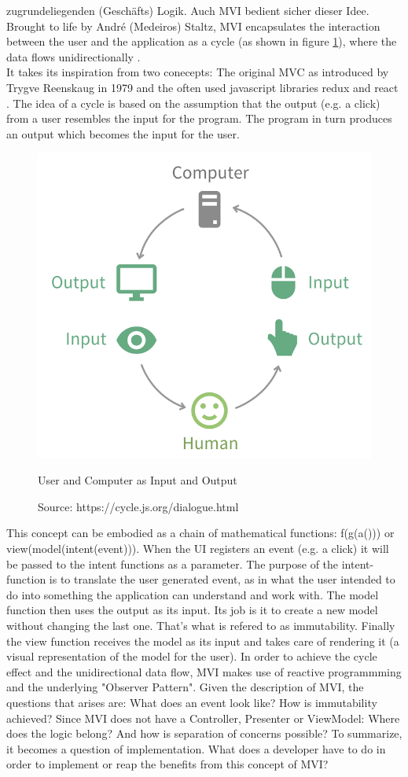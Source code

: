 zugrundeliegenden (Geschäfts) Logik. Auch MVI bedient sicher dieser Idee.
Brought to life by André (Medeiros) Staltz, MVI encapsulates the interaction between the user and the application as a cycle (as shown in figure \ref{fig:userComputerInputOutput}), 
where the data flows unidirectionally \cite{unidirectionalDataFlowRedux}.
\\
It takes its inspiration from two conecepts: The original MVC as introduced by Trygve Reenskaug in 1979 \cite{wikipediaTrygveReenskaug} and the often used 
javascript libraries redux \cite{redux} and react \cite{react}. 
The idea of a cycle is based on the assumption that the output (e.g. a click) from a user resembles the input for the program. The program in turn produces an output 
which becomes the input for the user.
\begin{figure}[ht]
    \centering
    \includegraphics[height=0.5\textwidth]{./images/mvi-cycle}
    \caption{User and Computer as Input and Output}
    \caption*{Source: https://cycle.js.org/dialogue.html}
    \label{fig:userComputerInputOutput}
\end{figure}
This concept can be embodied as a chain of mathematical functions: f(g(a())) or view(model(intent(event))).
When the UI registers an event (e.g. a click) it will be passed to the intent functions as a parameter. The purpose of the intent-function is 
to translate the user generated event, as in what the user intended to do into something the application can understand and work with.
The model function then uses the output as its input. Its job is it to create a new model without changing the last one. That's what is refered to as immutability. 
\cite{immutableObjectsEffectiveJava}
Finally the view function receives the model as its input and takes care of rendering it (a visual representation of the model for the user). 
In order to achieve the cycle effect and the unidirectional data flow, MVI makes use of reactive programmming \cite{reactiveProgrammingIntroAndreStaltz} and the underlying "Observer Pattern".
Given the description of MVI, the questions that arises are: What does an event look like? How is immutability achieved?
Since MVI does not have a Controller, Presenter or ViewModel: Where does the logic belong? And how is separation of concerns possible?
To summarize, it becomes a question of implementation. What does a developer have to do in order to implement or reap the benefits from this concept of MVI?

